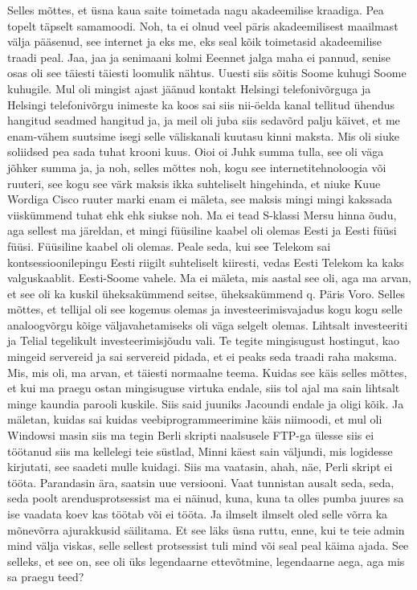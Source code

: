 Selles mõttes, et üsna kaua saite toimetada nagu akadeemilise kraadiga.
Pea topelt täpselt samamoodi. Noh, ta ei olnud veel päris akadeemilisest maailmast välja pääsenud, see internet ja eks me, eks seal kõik toimetasid akadeemilise traadi peal. Jaa, jaa ja senimaani kolmi Eeennet jalga maha ei pannud, senise osas oli see täiesti täiesti loomulik nähtus. Uuesti siis sõitis Soome kuhugi Soome kuhugile. Mul oli mingist ajast jäänud kontakt Helsingi telefonivõrguga ja Helsingi telefonivõrgu inimeste ka koos sai siis nii-öelda kanal tellitud ühendus hangitud seadmed hangitud ja, ja meil oli juba siis sedavõrd palju käivet, et me enam-vähem suutsime isegi selle väliskanali kuutasu kinni maksta. Mis oli siuke soliidsed pea sada tuhat krooni kuus. Oioi oi Juhk summa tulla, see oli väga jõhker summa ja, ja noh, selles mõttes noh, kogu see internetitehnoloogia või ruuteri, see kogu see värk maksis ikka suhteliselt hingehinda, et niuke Kuue Wordiga Cisco ruuter marki enam ei mäleta, see maksis mingi mingi kakssada viiskümmend tuhat ehk ehk siukse noh.
Ma ei tead S-klassi Mersu hinna õudu, aga sellest ma järeldan, et mingi füüsiline kaabel oli olemas Eesti ja Eesti füüsi füüsi. Füüsiline kaabel oli olemas. Peale seda, kui see Telekom sai kontsessioonilepingu Eesti riigilt suhteliselt kiiresti, vedas Eesti Telekom ka kaks valguskaablit. Eesti-Soome vahele. Ma ei mäleta, mis aastal see oli, aga ma arvan, et see oli ka kuskil üheksakümmend seitse, üheksakümmend q. Päris Voro. Selles mõttes, et tellijal oli see kogemus olemas ja investeerimisvajadus kogu kogu selle analoogvõrgu kõige väljavahetamiseks oli väga selgelt olemas. Lihtsalt investeeriti ja Telial tegelikult investeerimisjõudu vali. Te tegite mingisugust hostingut, kao mingeid servereid ja sai servereid pidada, et ei peaks seda traadi raha maksma. Mis, mis oli, ma arvan, et täiesti normaalne teema.
Kuidas see käis selles mõttes, et kui ma praegu ostan mingisuguse virtuka endale, siis tol ajal ma sain lihtsalt minge kaundia parooli kuskile.
Siis said juuniks Jacoundi endale ja oligi kõik.
Ja mäletan, kuidas sai kuidas veebiprogrammeerimine käis niimoodi, et mul oli Windowsi masin siis ma tegin Berli skripti naalsusele FTP-ga ülesse siis ei töötanud siis ma kellelegi teie süstlad, Minni käest sain väljundi, mis logidesse kirjutati, see saadeti mulle kuidagi. Siis ma vaatasin, ahah, näe, Perli skript ei tööta.
Parandasin ära, saatsin uue versiooni. Vaat tunnistan ausalt seda, seda, seda poolt arendusprotsessist ma ei näinud, kuna, kuna ta olles pumba juures sa ise vaadata koev kas töötab või ei tööta.
Ja ilmselt ilmselt oled selle võrra ka mõnevõrra ajurakkusid säilitama. Et see läks üsna ruttu, enne, kui te teie admin mind välja viskas, selle sellest protsessist tuli mind või seal peal käima ajada. See selleks, et see on, see oli üks legendaarne ettevõtmine, legendaarne aega, aga mis sa praegu teed?
